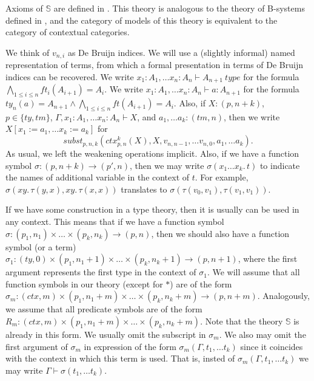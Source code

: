 \documentclass{mscs}
\newcommand{\repl}{:=}
\newcommand{\emptyCtx}{*}
\newcommand{\substTh}{\mathbb{S}}
\numberwithin{figure}{section}
\begin{document}
Axioms of $\substTh$ are defined in \cite{alg-tt}.
This theory is analogous to the theory of B-systems defined in \cite{b-systems},
and the category of models of this theory is equivalent to the category of contextual categories.

We think of $v_{n,i}$ as De Bruijn indices.
We will use a (slightly informal) named representation of terms,
from which a formal presentation in terms of De Bruijn indices can be recovered.
We write $x_1 : A_1, \ldots x_n : A_n \vdash A_{n+1}\ type$ for the formula $\bigwedge_{1 \leq i \leq n} ft_i(A_{i+1}) = A_i$.
We write $x_1 : A_1, \ldots x_n : A_n \vdash a : A_{n+1}$ for the formula $ty_n(a) = A_{n+1} \land \bigwedge_{1 \leq i \leq n} ft(A_{i+1}) = A_i$.
Also, if $X : (p,n+k)$, $p \in \{ ty, tm \}$, $\Gamma, x_1 : A_1, \ldots x_n : A_n \vdash X$, and $a_1, \ldots a_k : (tm,n)$,
then we write $X[x_1 \repl a_1, \ldots x_k \repl a_k]$ for
\[ subst_{p,n,k}(ctx^k_{p,n}(X), X, v_{n,n-1}, \ldots v_{n,0}, a_1, \ldots a_k). \]
As usual, we left the weakening operations implicit.
Also, if we have a function symbol $\sigma : (p,n+k) \to (p',n)$, then we may write $\sigma(x_1 \ldots x_k.\,t)$ to indicate the names of additional variable in the context of $t$.
For example, $\sigma(x y.\,\tau(y,x), x y.\,\tau(x,x))$ translates to $\sigma(\tau(v_0,v_1), \tau(v_1,v_1))$.

If we have some construction in a type theory, then it is usually can be used in any context.
This means that if we have a function symbol $\sigma : (p_1,n_1) \times \ldots \times (p_k,n_k) \to (p,n)$,
then we should also have a function symbol (or a term) $\sigma_1 : (ty,0) \times (p_1,n_1+1) \times \ldots \times (p_k,n_k+1) \to (p,n+1)$,
where the first argument represents the first type in the context of $\sigma_1$.
We will assume that all function symbols in our theory (except for $\emptyCtx$) are of the form $\sigma_m : (ctx,m) \times (p_1,n_1+m) \times \ldots \times (p_k,n_k+m) \to (p,n+m)$.
Analogously, we assume that all predicate symbols are of the form $R_m : (ctx,m) \times (p_1,n_1+m) \times \ldots \times (p_k,n_k+m)$.
Note that the theory $\substTh$ is already in this form.
We usually omit the subscript in $\sigma_m$.
We also may omit the first argument of $\sigma_m$ in expression of the form $\sigma_m(\Gamma, t_1, \ldots t_k)$ since it coincides with the context in which this term is used.
That is, insted of $\sigma_m(\Gamma, t_1, \ldots t_k)$ we may write $\Gamma \vdash \sigma(t_1, \ldots t_k)$.
\end{document}
